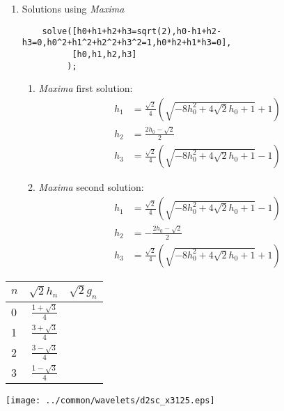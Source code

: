 \begin{example}
\begin{enumerate}
\item Solutions using {\em Maxima}\texttrademark \\
  \begin{verbatim}
    solve([h0+h1+h2+h3=sqrt(2),h0-h1+h2-h3=0,h0^2+h1^2+h2^2+h3^2=1,h0*h2+h1*h3=0],
          [h0,h1,h2,h3]
         );
  \end{verbatim}
\begin{enumerate}
\item {\em Maxima} first solution:
  \begin{align*}
    h_1 &= \frac{\sqrt{2}}{4}\left(\sqrt{-8h_0^2+4\sqrt{2}h_0+1}+1\right)
  \\h_2 &= \frac{2h_0-\sqrt{2}}{2}
  \\h_3 &= \frac{\sqrt{2}}{4}\left(\sqrt{-8h_0^2+4\sqrt{2}h_0+1}-1\right)
  \end{align*}

\item {\em Maxima} second solution:
  \begin{align*}
    h_1 &= \frac{\sqrt{2}}{4}\left(\sqrt{-8h_0^2+4\sqrt{2}h_0+1}-1\right)
  \\h_2 &= -\frac{2h_0-\sqrt{2}}{2}
  \\h_3 &= \frac{\sqrt{2}}{4}\left(\sqrt{-8h_0^2+4\sqrt{2}h_0+1}+1\right)
  \end{align*}
\end{enumerate}
\end{enumerate}

  \parbox[b][35\tw/160][c]{5\tw/16}{\begin{tabular}[b]{l|r|r}
    $n$ & $\sqrt{2} h_n $ & $\sqrt{2} g_n $ \\
    \hline
      0   & $\frac{1+\sqrt{3}}{4}$  \\ %
      1   & $\frac{3+\sqrt{3}}{4}$  \\ %
      2   & $\frac{3-\sqrt{3}}{4}$  \\ %
      3   & $\frac{1-\sqrt{3}}{4}$  \\ %
  \end{tabular}}
  \texttt{[image: ../common/wavelets/d2sc\_x3125.eps]}
\end{example}




